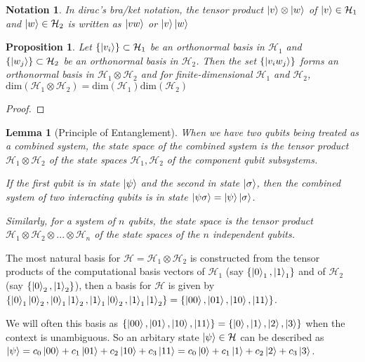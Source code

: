 \documentclass[12pt,twoside]{report}
\theoremstyle{thmstyle}
\newtheorem{notation}[subsection]{Notation}
\newtheorem{lemma}[subsection]{Lemma}
\newtheorem{prop}[subsection]{Proposition}
\begin{document}
\begin{notation}
    In dirac's bra/ket notation, the tensor product $\ket{v} \otimes \ket{w}$ of $\ket{v} \in \mathcal{H}_1$ and $\ket{w} \in \mathcal{H}_2$ is written as $\ket{vw}$ or $\ket{v}\ket{w}$
\end{notation}

\begin{prop}
    Let $\{ \ket{v_i} \} \subset \mathcal{H}_1$ be an orthonormal basis in $\mathcal{H}_1$ and $\{ \ket{w_j} \} \subset \mathcal{H}_2$ be an orthonormal basis in $\mathcal{H}_2$. Then the set $\{ \ket{v_i w_j} \}$ forms an orthonormal basis in $\mathcal{H}_1 \otimes \mathcal{H}_2$ and for finite-dimensional $\mathcal{H}_1$ and $\mathcal{H}_2$, $\text{dim}(\mathcal{H}_1 \otimes \mathcal{H}_2) = \text{dim}(\mathcal{H}_1) \text{dim}(\mathcal{H}_2)$
\end{prop}
\begin{proof}
\end{proof}

\begin{lemma}[Principle of Entanglement]
When we have two qubits being treated as a combined system, the state space of the combined system is the tensor product $\mathcal{H}_1 \otimes \mathcal{H}_2$ of the state spaces $\mathcal{H}_1, \mathcal{H}_2$ of the component qubit subsystems. 

    \vspace{0.2cm}
If the first qubit is in state $\ket{\psi}$ and the second in state $\ket{\sigma}$, then the combined system of two interacting qubits is in state $\ket{\psi\sigma} = \ket{\psi}\ket{\sigma}$.

    \vspace{0.2cm}
Similarly, for a system of $n$ qubits, the state space is the tensor product $\mathcal{H}_1 \otimes \mathcal{H}_2 \otimes ... \otimes \mathcal{H}_n$ of the state spaces of the $n$ independent qubits.
\end{lemma}

The most natural basis for $\mathcal{H} = \mathcal{H}_1 \otimes \mathcal{H}_2$ is constructed from the tensor products of the computational basis vectors of $\mathcal{H}_1$ (say $\{ \ket{0}_1, \ket{1}_1 \}$ and of $\mathcal{H}_2$ (say $\{ \ket{0}_2, \ket{1}_2 \}$), then a basis for $\mathcal{H}$ is given by $\{ \ket{0}_1\ket{0}_2, \ket{0}_1\ket{1}_2, \ket{1}_1\ket{0}_2, \ket{1}_1\ket{1}_2 \} \\ = \{ \ket{00}, \ket{01}, \ket{10}, \ket{11} \}$.

We will often this basis as $\{ \ket{00}, \ket{01}, \ket{10}, \ket{11} \} = \{ \ket{0}, \ket{1}, \ket{2}, \ket{3} \}$ when the context is unambiguous. So an arbitary state $\ket{\psi} \in \mathcal{H}$ can be described as $\ket{\psi} = c_0 \ket{00} + c_1 \ket{01} + c_2 \ket{10} + c_3 \ket{11} = c_0 \ket{0} + c_1 \ket{1} + c_2 \ket{2} + c_3 \ket{3}$.
\end{document}
